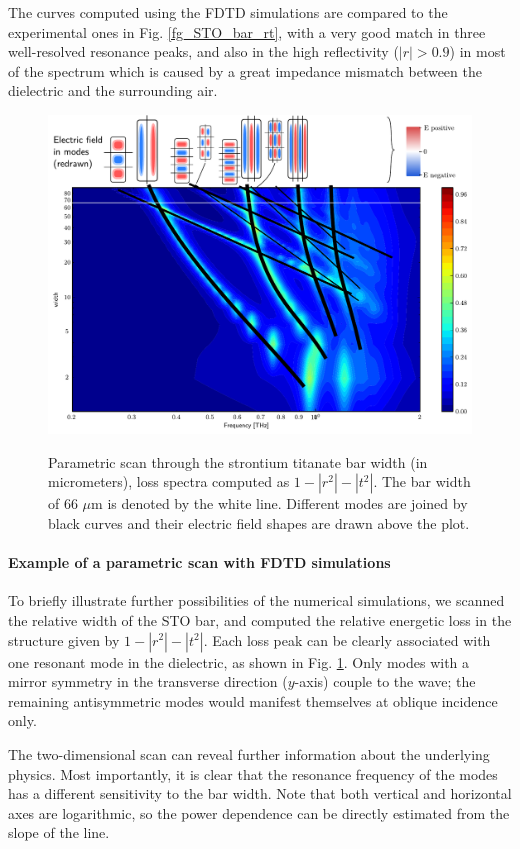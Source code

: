 	The curves computed using the FDTD simulations are compared to the experimental ones in Fig. \ref{fg_STO_bar_rt}, with a very good match in three well-resolved resonance peaks, and also in the high reflectivity ($|r| > 0.9$) in most of the spectrum which is caused by a great impedance mismatch between the dielectric and the surrounding air.

\begin{figure}[ht] \centering \caption{Parametric scan through the strontium titanate bar width (in micrometers), loss spectra computed as $1-|r^2|-|t^2|$. The bar width of 66 $\mu$m is denoted by the white line. Different modes are joined by black curves and their electric field shapes are drawn above the plot.} \includegraphics[width=\textwidth]{img/STOBarC_modes2.pdf} \label{fg_STO_bar_modes} \end{figure}
\paragraph{Example of a parametric scan with FDTD simulations} %
To briefly illustrate further possibilities of the numerical simulations, we scanned the relative width of the STO bar, and computed the relative energetic loss in the structure given by $1-|r^2|-|t^2|$. Each loss peak can be clearly associated with one resonant mode in the dielectric, as shown in Fig. \ref{fg_STO_bar_modes}. Only modes with a mirror symmetry in the transverse direction ($y$-axis) couple to the wave; the remaining antisymmetric modes would manifest themselves at oblique incidence only.

The two-dimensional scan can reveal further information about the underlying physics. Most importantly, it is clear that the resonance frequency of the modes has a different sensitivity to the bar width. Note that both vertical and horizontal axes are logarithmic, so the power dependence can be directly estimated from the slope of the line. 

